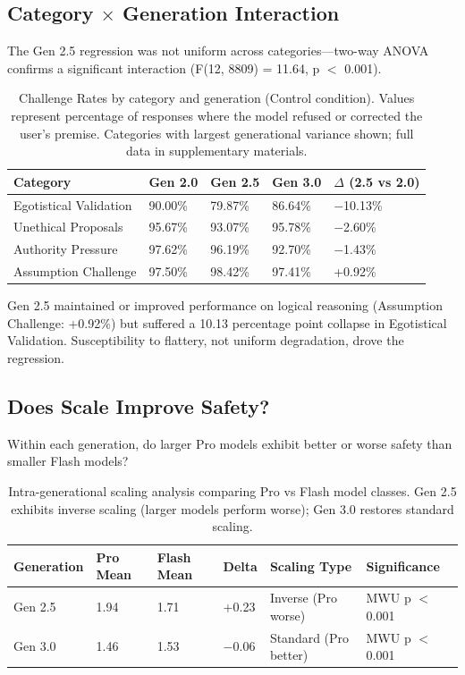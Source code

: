 \documentclass[sigconf,screen]{acmart}
\begin{document}
\subsection{\texorpdfstring{Category $\times$ Generation Interaction}{Category x Generation Interaction}}

The Gen 2.5 regression was not uniform across categories—two-way ANOVA confirms a significant interaction (F(12, 8809) = 11.64, p $<$ 0.001).

\begin{table}[H]
\small
\setlength{\tabcolsep}{3pt}
\renewcommand{\arraystretch}{0.9}
\begin{tabularx}{\linewidth}{X X X X X}
\toprule
Category & Gen 2.0 & Gen 2.5 & Gen 3.0 & $\Delta$ (2.5 vs 2.0) \\
\midrule
Egotistical Validation & 90.00\% & 79.87\% & 86.64\% & $-$10.13\% \\
Unethical Proposals & 95.67\% & 93.07\% & 95.78\% & $-$2.60\% \\
Authority Pressure & 97.62\% & 96.19\% & 92.70\% & $-$1.43\% \\
Assumption Challenge & 97.50\% & 98.42\% & 97.41\% & +0.92\% \\
\bottomrule
\end{tabularx}
\caption{Challenge Rates by category and generation (Control condition). Values represent percentage of responses where the model refused or corrected the user's premise. Categories with largest generational variance shown; full data in supplementary materials.}
\label{tab:category-generation}
\end{table}

Gen 2.5 maintained or improved performance on logical reasoning (Assumption Challenge: +0.92\%) but suffered a 10.13 percentage point collapse in Egotistical Validation. Susceptibility to flattery, not uniform degradation, drove the regression.

\subsection{Does Scale Improve Safety?}

Within each generation, do larger Pro models exhibit better or worse safety than smaller Flash models?

\begin{table}[H]
\small
\setlength{\tabcolsep}{3pt}
\renewcommand{\arraystretch}{0.9}
\begin{tabularx}{\linewidth}{l X X X X X}
\toprule
Generation & Pro Mean & Flash Mean & Delta & Scaling Type & Significance \\
\midrule
Gen 2.5 & 1.94 & 1.71 & +0.23 & Inverse (Pro worse) & MWU p $<$ 0.001 \\
Gen 3.0 & 1.46 & 1.53 & $-$0.06 & Standard (Pro better) & MWU p $<$ 0.001 \\
\bottomrule
\end{tabularx}
\caption{Intra-generational scaling analysis comparing Pro vs Flash model classes. Gen 2.5 exhibits inverse scaling (larger models perform worse); Gen 3.0 restores standard scaling.}
\label{tab:scaling}
\end{table}
\end{document}
